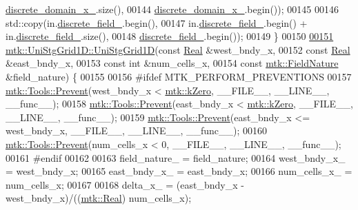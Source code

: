 \begin{DoxyCode}
      \hyperlink{classmtk_1_1UniStgGrid1D_a0a1f9c00e21659e05f414dd97e2a52e3}{discrete\_domain\_x\_}.size(),
00144               \hyperlink{classmtk_1_1UniStgGrid1D_a0a1f9c00e21659e05f414dd97e2a52e3}{discrete\_domain\_x\_}.begin());
00145 
00146     std::copy(in.\hyperlink{classmtk_1_1UniStgGrid1D_a7379a5c6d16210cdd61ffa731bc47edc}{discrete\_field\_}.begin(),
00147               in.\hyperlink{classmtk_1_1UniStgGrid1D_a7379a5c6d16210cdd61ffa731bc47edc}{discrete\_field\_}.begin() + in.\hyperlink{classmtk_1_1UniStgGrid1D_a7379a5c6d16210cdd61ffa731bc47edc}{discrete\_field\_}.size(),
00148               \hyperlink{classmtk_1_1UniStgGrid1D_a7379a5c6d16210cdd61ffa731bc47edc}{discrete\_field\_}.begin());
00149 \}
00150 
\hypertarget{mtk__uni__stg__grid__1d_8cc_source_l00151}{}\hyperlink{classmtk_1_1UniStgGrid1D_a02a40f5c15b0ff4249c1497221dd41ea}{00151} \hyperlink{classmtk_1_1UniStgGrid1D_ab0c1bb8afad2420fdb4434eb21bdec82}{mtk::UniStgGrid1D::UniStgGrid1D}(\textcolor{keyword}{const} \hyperlink{group__c01-roots_gac080bbbf5cbb5502c9f00405f894857d}{Real} &west\_bndy\_x,
00152                                 \textcolor{keyword}{const} \hyperlink{group__c01-roots_gac080bbbf5cbb5502c9f00405f894857d}{Real} &east\_bndy\_x,
00153                                 \textcolor{keyword}{const} \textcolor{keywordtype}{int} &num\_cells\_x,
00154                                 \textcolor{keyword}{const} \hyperlink{group__c02-enums_ga4c54f2a329cfb4e56213b02a259d19e2}{mtk::FieldNature} &field\_nature) \{
00155 
00156 \textcolor{preprocessor}{  #ifdef MTK\_PERFORM\_PREVENTIONS}
00157   \hyperlink{classmtk_1_1Tools_a332324c6f25e66be9dff48c5987a3b9f}{mtk::Tools::Prevent}(west\_bndy\_x < \hyperlink{group__c01-roots_ga59a451a5fae30d59649bcda274fea271}{mtk::kZero}, \_\_FILE\_\_, \_\_LINE\_\_, \_\_func\_\_);
00158   \hyperlink{classmtk_1_1Tools_a332324c6f25e66be9dff48c5987a3b9f}{mtk::Tools::Prevent}(east\_bndy\_x < \hyperlink{group__c01-roots_ga59a451a5fae30d59649bcda274fea271}{mtk::kZero}, \_\_FILE\_\_, \_\_LINE\_\_, \_\_func\_\_);
00159   \hyperlink{classmtk_1_1Tools_a332324c6f25e66be9dff48c5987a3b9f}{mtk::Tools::Prevent}(east\_bndy\_x <= west\_bndy\_x, \_\_FILE\_\_, \_\_LINE\_\_, \_\_func\_\_);
00160   \hyperlink{classmtk_1_1Tools_a332324c6f25e66be9dff48c5987a3b9f}{mtk::Tools::Prevent}(num\_cells\_x < 0, \_\_FILE\_\_, \_\_LINE\_\_, \_\_func\_\_);
00161 \textcolor{preprocessor}{  #endif}
00162 
00163   field\_nature\_ = field\_nature;
00164   west\_bndy\_x\_ = west\_bndy\_x;
00165   east\_bndy\_x\_ = east\_bndy\_x;
00166   num\_cells\_x\_ = num\_cells\_x;
00167 
00168   delta\_x\_ = (east\_bndy\_x - west\_bndy\_x)/((\hyperlink{group__c01-roots_gac080bbbf5cbb5502c9f00405f894857d}{mtk::Real}) num\_cells\_x);

\end{DoxyCode}
